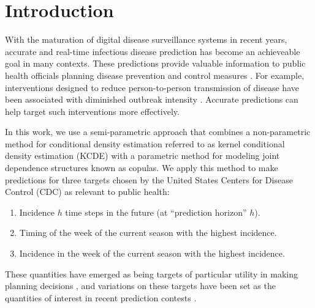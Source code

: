 \documentclass[times, doublespace]{simauth}\usepackage[]{graphicx}\usepackage[]{color}
\begin{document}

\maketitle








\section{Introduction}
\label{sec:Intro}

With the maturation of digital disease surveillance systems in recent years,
accurate and real-time infectious disease prediction has become an achieveable goal in many contexts.
These predictions provide valuable information to
public health officials planning disease prevention and control measures
\cite{Manheim:2016ur}.
For example, interventions designed to reduce person-to-person transmission of disease
have been associated with diminished outbreak intensity
\cite{hatchett2007interventionsIntensity1918flu}.  Accurate
predictions can help target such interventions more effectively.

In this work, we use a semi-parametric approach that combines a non-parametric
method for conditional density estimation referred to as kernel conditional
density estimation (KCDE) with a parametric method for modeling joint dependence
structures known as copulas.  We apply this method to make predictions for three targets
chosen by the United States Centers for Disease Control (CDC) as relevant to public health:
\begin{enumerate}
  \item Incidence $h$ time steps in the future (at ``prediction horizon'' $h$).
  \item Timing of the week of the current season with the highest incidence.
  \item Incidence in the week of the current season with the highest incidence.
\end{enumerate}
These quantities have emerged as being targets of particular utility in making planning decisions
\cite{PandemicPredictionandForecastingScienceandTechnologyInteragencyWorkingGroup2015Announcement,
EpidemicPredictionInitiative2015Index}, and variations on these targets have been set as the
quantities of interest in recent prediction contests \cite{biggerstaff2016resultsCDC20132014InfluenzaChallenge}.
\end{document}
